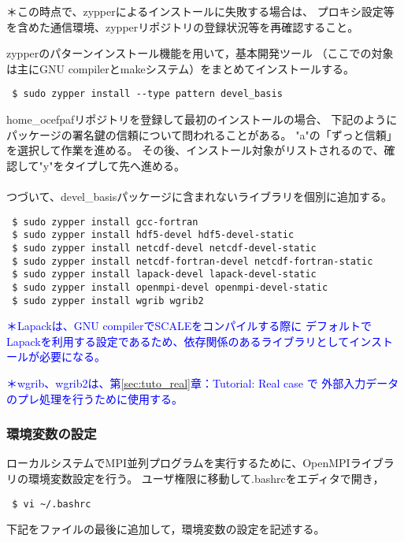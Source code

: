 {\small ＊この時点で、zypperによるインストールに失敗する場合は、
プロキシ設定等を含めた通信環境、zypperリポジトリの登録状況等を再確認すること。}

\noindent zypperのパターンインストール機能を用いて，基本開発ツール
（ここでの対象は主にGNU compilerとmakeシステム）をまとめてインストールする。
\begin{verbatim}
 $ sudo zypper install --type pattern devel_basis
\end{verbatim}

home\_ocefpafリポジトリを登録して最初のインストールの場合、
下記のようにパッケージの署名鍵の信頼について問われることがある。
"a"の「ずっと信頼」を選択して作業を進める。
その後、インストール対象がリストされるので、確認して"y"をタイプして先へ進める。\\

\\

\noindent つづいて、devel\_basisパッケージに含まれないライブラリを個別に追加する。
\begin{verbatim}
 $ sudo zypper install gcc-fortran
 $ sudo zypper install hdf5-devel hdf5-devel-static
 $ sudo zypper install netcdf-devel netcdf-devel-static
 $ sudo zypper install netcdf-fortran-devel netcdf-fortran-static
 $ sudo zypper install lapack-devel lapack-devel-static
 $ sudo zypper install openmpi-devel openmpi-devel-static
 $ sudo zypper install wgrib wgrib2
\end{verbatim}

\noindent \textcolor{blue}{\small ＊Lapackは、GNU compilerでSCALEをコンパイルする際に
デフォルトでLapackを利用する設定であるため、依存関係のあるライブラリとしてインストールが必要になる。}

\noindent \textcolor{blue}{\small ＊wgrib、wgrib2は、第\ref{sec:tuto_real}章：Tutorial: Real case で
外部入力データのプレ処理を行うために使用する。}


\subsubsection{環境変数の設定}

ローカルシステムでMPI並列プログラムを実行するために、OpenMPIライブラリの環境変数設定を行う。
ユーザ権限に移動して.bashrcをエディタで開き，
\begin{verbatim}
 $ vi ~/.bashrc
\end{verbatim}
下記をファイルの最後に追加して，環境変数の設定を記述する。\\

